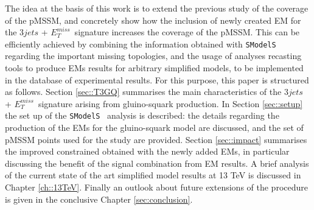 \documentclass[a4paper,11pt]{article}
\newcommand{\MET}{{ $E_T ^{miss}$}}
\newcommand{\SMO}{\texttt{SModelS\xspace}}
\begin{document}
%

The idea at the basis of this work is to extend the previous study of the coverage of the pMSSM, and concretely show how the inclusion of newly created EM for the $3jets$ + \MET~signature increases the coverage of the pMSSM. This can be efficiently achieved by combining the information obtained with \SMO~ regarding the important missing topologies, and the usage of analyses recasting tools to produce EMs results for arbitrary simplified models, to be implemented in the database of experimental results. For this purpose, this paper is structured as follows. Section \ref{sec::T3GQ} summarises the main characteristics of the $3jets$ + \MET~signature arising from gluino-squark production. In Section \ref{sec::setup} the set up of the \SMO~ analysis is described: the details regarding the production of the EMs for the gluino-squark model are discussed, and the set of pMSSM points used for the study are provided. Section \ref{sec::impact} summarises the improved constrained obtained with the newly added EMs, in particular discussing the benefit of the signal combination from EM results. A brief analysis of the current state of the art simplified model results at 13 TeV is discussed in Chapter \ref{ch::13TeV}. Finally an outlook about future extensions of the procedure is given in the conclusive Chapter \ref{sec:conclusion}.  
%
\end{document}
